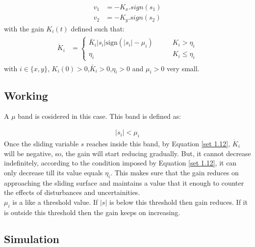 \documentclass{article}
\begin{document}
\begin{equation}\label{set 1.11}
  \begin{split}
   v_1&=-K_x.sign(s_1) \\
   v_2&=-K_y.sign(s_2)  
  \end{split}
\end{equation}
with the gain $K_i(t)$ defined such that:
\begin{align}
\begin{split}\label{set 1.12}
\dot{K}_i & = \begin{cases}\bar{K}_i|s_i|\mathrm{sign}(|s_i| - \mu_i)\qquad &K_i > \eta_i\\\eta_i &K_i\leq \eta_i\end{cases}
\end{split}
\end{align}
with $i\in\{x,y\}$, $K_i(0)>0$,$\bar{K}_{i}>0$,$\eta_i>0$ and $\mu_i>0$ very small.
\subsection{Working}
A $\mu$ band is cosidered in this case. This band is defined as:

\begin{align}
|s_i|<\mu_i 
\label{set 1.13}
\end{align}
Once the sliding variable $s$ reaches inside this band, by Equation \ref{set 1.12}, $\dot{K}_i$ will be negative, so, the gain will start reducing gradually. But, it cannot decrease indefinitely, according to the condition imposed by Equation \ref{set 1.12}, it can only decrease till its value equals $\eta_i$. This makes sure that the gain reduces on approaching the sliding surface and maintains a value that it enough to counter the effects of disturbances and uncertainities.\\
$\mu_i$ is a like a threshold value. If $|s|$ is below this threshold then gain reduces. If it is outside this threshold then the gain keeps on increasing.
\subsection{Simulation}
\end{document}
